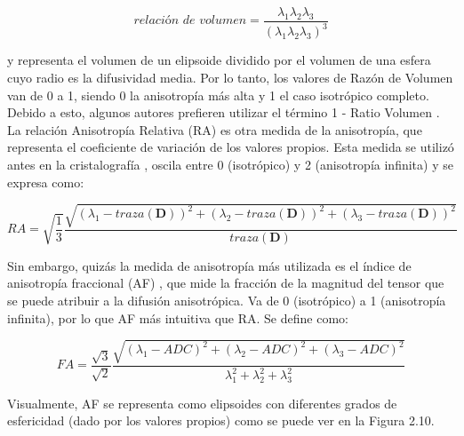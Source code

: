 \documentclass[12pt,a5,twoside]{book}
\begin{document}
\begin{equation}
\textit{relaci\'on de volumen} = \frac{\lambda_{1}\lambda_{2}\lambda_{3}}{(\lambda_{1}\lambda_{2}\lambda_{3})^{3}}
\end{equation}

y representa el volumen de un elipsoide dividido por el volumen de una esfera cuyo radio es la difusividad media. Por lo tanto, los valores de Razón de Volumen van de 0 a 1, siendo 0 la anisotropía más alta y 1 el caso isotrópico completo. Debido a esto, algunos autores prefieren utilizar el término 1 - Ratio Volumen \citep{Pierpaoli_1996}.
La relación Anisotropía Relativa (RA) es otra medida de la anisotropía, que representa el coeficiente de variación de los valores propios. Esta medida se utilizó antes en la cristalografía \citep{Sands_1995}, oscila entre 0 (isotrópico) y 2 (anisotropía infinita) y se expresa como:

\begin{equation}
RA = \sqrt{\frac{1}{3}} \frac{\sqrt{(\lambda_{1} - traza (\textbf{D}))^{2} + (\lambda_{2} - traza (\textbf{D}))^{2} + (\lambda_{3} - traza (\textbf{D}))^{2}}}{traza (\textbf{D})}
\end{equation} 

Sin embargo, quizás la medida de anisotropía más utilizada es el índice de anisotropía fraccional (AF) \citep{Basser_1996}, que mide la fracción de la magnitud del tensor que se puede atribuir a la difusión anisotrópica. Va de 0 (isotrópico) a 1 (anisotropía infinita), por lo que AF más intuitiva que RA. Se define como:

\begin{equation}
FA = \frac{\sqrt{3}}{\sqrt{2}} \frac{\sqrt{(\lambda_{1} - ADC)^{2} + (\lambda_{2} - ADC)^{2} + (\lambda_{3} - ADC)^{2}}}{\lambda_1^2 + \lambda_2^2 + \lambda_3^2}
\end{equation}

Visualmente, AF se representa como elipsoides con diferentes grados de esfericidad (dado por los valores propios) como se puede ver en la Figura 2.10.\\
\end{document}
